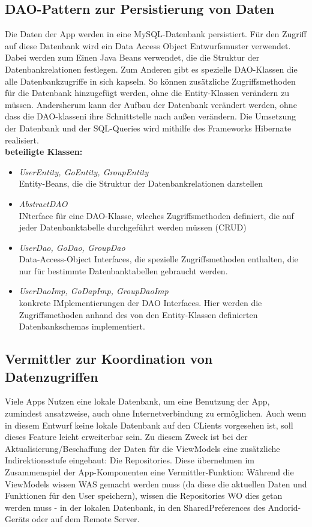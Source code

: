 \documentclass[parskip=full]{scrartcl}
\begin{document}
\subsection{DAO-Pattern zur Persistierung von Daten}
Die Daten der App werden in eine MySQL-Datenbank persistiert. Für den Zugriff auf diese Datenbank wird ein Data Access Object Entwurfsmuster verwendet. Dabei werden zum Einen Java Beans verwendet, die die Struktur der Datenbankrelationen festlegen. Zum Anderen gibt es spezielle DAO-Klassen die alle Datenbankzugriffe in sich kapseln. So können zusätzliche Zugriffsmethoden für die Datenbank hinzugefügt werden, ohne die Entity-Klassen verändern zu müssen. Andersherum kann der Aufbau der Datenbank verändert werden, ohne dass die DAO-klasseni ihre Schnittstelle nach außen verändern.
Die Umsetzung der Datenbank und der SQL-Queries wird mithilfe des Frameworks Hibernate realisiert.\\

\textbf{beteiligte Klassen:}
\begin{itemize}
	\item \textit{UserEntity, GoEntity, GroupEntity}\\ Entity-Beans, die die Struktur der Datenbankrelationen darstellen
	\item \textit{AbstractDAO}\\ INterface für eine DAO-Klasse, wleches Zugriffsmethoden definiert, die auf jeder Datenbanktabelle durchgeführt werden müssen (CRUD)
	\item \textit{UserDao, GoDao, GroupDao}\\ Data-Access-Object Interfaces, die spezielle Zugriffsmethoden enthalten, die nur für bestimmte Datenbanktabellen gebraucht werden.
	\item \textit{UserDaoImp, GoDapImp, GroupDaoImp}\\ konkrete IMplementierungen der DAO Interfaces. Hier werden die Zugriffsmethoden anhand des von den Entity-Klassen definierten Datenbankschemas
	implementiert.
\end{itemize}

\subsection{Vermittler zur Koordination von Datenzugriffen}\label{Vermittler}
Viele Apps Nutzen eine lokale Datenbank, um eine Benutzung der App, zumindest ansatzweise, auch ohne Internetverbindung zu ermöglichen. Auch wenn in diesem Entwurf keine lokale Datenbank auf den CLients vorgesehen ist, soll dieses Feature leicht erweiterbar sein. Zu diesem Zweck ist bei der Aktualisierung/Beschaffung der Daten für die ViewModels eine zusätzliche Indirektionsstufe eingebaut: Die Repositories. Diese übernehmen im Zusammenspiel der App-Komponenten eine Vermittler-Funktion: Während die ViewModels wissen WAS gemacht werden muss (da diese die aktuellen Daten und Funktionen für den User speichern), wissen die Repositories WO dies getan werden muss - in der lokalen Datenbank, in den SharedPreferences des Andorid-Geräts oder auf dem Remote Server.
\end{document}
